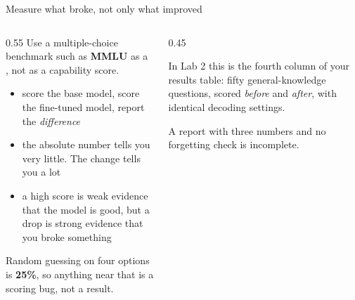 \documentclass[aspectratio=169,10pt]{beamer}
\begin{document}
\begin{frame}{Measure what broke, not only what improved}
  \begin{columns}[T]
    \begin{column}{0.55\textwidth}
      Use a multiple-choice benchmark such as \textbf{MMLU} as a
      , not as a capability score.
      \vspace{0.5em}
      \begin{itemize}
        \item score the base model, score the fine-tuned model, report the
          \emph{difference}
        \item the absolute number tells you very little. The change tells you
          a lot
        \item a high score is weak evidence that the model is good, but a drop
          is strong evidence that you broke something
      \end{itemize}
      \vspace{0.5em}
      Random guessing on four options is \textbf{25\%}, so anything near that
      is a scoring bug, not a result.
    \end{column}
    \begin{column}{0.45\textwidth}
      \begin{takeaway}
        \small
        In Lab 2 this is the fourth column of your results table: fifty
        general-knowledge questions, scored \emph{before} and \emph{after}, with
        identical decoding settings.
        \vspace{0.4em}

        A report with three numbers and no forgetting check is incomplete.
      \end{takeaway}
    \end{column}
  \end{columns}
\end{frame}
\end{document}
